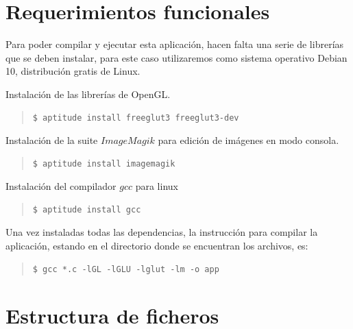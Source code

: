 \documentclass[12pt,a4paper]{article}
\begin{document}
\newpage

\section{Requerimientos funcionales}

Para poder compilar y ejecutar esta aplicación, hacen falta una serie de librerías que se deben instalar, para este caso utilizaremos como sistema operativo Debian 10, distribución gratis de Linux.

Instalación de las librerías de OpenGL.

\begin{verse}
\begin{verbatim}
$ aptitude install freeglut3 freeglut3-dev
\end{verbatim}
\end{verse}

Instalación de la suite $ImageMagik$ para edición de imágenes en modo consola.

\begin{verse}
\begin{verbatim}
$ aptitude install imagemagik
\end{verbatim}
\end{verse}

Instalación del compilador $gcc$ para linux

\begin{verse}
\begin{verbatim}
$ aptitude install gcc
\end{verbatim}
\end{verse}

\vspace{1cm}
Una vez instaladas todas las dependencias, la instrucción para compilar la aplicación, estando en el directorio donde se encuentran los archivos, es:

\begin{verse}
\begin{verbatim}
$ gcc *.c -lGL -lGLU -lglut -lm -o app
\end{verbatim}
\end{verse}









\newpage
\section{Estructura de ficheros}
\end{document}
